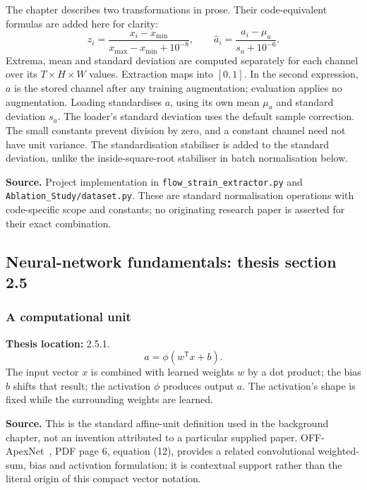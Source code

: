 \documentclass[11pt,a4paper]{article}
\numberwithin{equation}{section}
\begin{document}
\label{fg:input-normalisation}
The chapter describes two transformations in prose. Their code-equivalent
formulas are added here for clarity:
\begin{equation}
    z_i=\frac{x_i-x_{\min}}{x_{\max}-x_{\min}+10^{-8}},
    \qquad
    \widehat a_i=\frac{a_i-\mu_a}{s_a+10^{-6}}.
    \label{fg:eq:input-normalisation}
\end{equation}
Extrema, mean and standard deviation are computed separately for each channel
over its $T\times H\times W$ values. Extraction maps into $[0,1]$.
In the second expression, $a$ is the stored channel after any training
augmentation; evaluation applies no augmentation. Loading standardises $a$,
using its own mean $\mu_a$ and standard deviation $s_a$. The loader's standard
deviation uses the default sample correction. The small constants prevent
division by zero, and a constant channel need not have unit variance. The
standardisation stabiliser is added to the standard deviation, unlike the
inside-square-root stabiliser in batch normalisation below.

\textbf{Source.} Project implementation in
\texttt{flow\_strain\_extractor.py} and \texttt{Ablation\_Study/dataset.py}.
These are standard normalisation operations with code-specific scope and
constants; no originating research paper is asserted for their exact combination.

\subsection{Neural-network fundamentals: thesis section 2.5}

\subsubsection{A computational unit}
\label{fg:unit}
\textbf{Thesis location:} 2.5.1.
\begin{equation}
    a=\phi(w^{\mathsf T}x+b).
    \label{fg:eq:unit}
\end{equation}
The input vector $x$ is combined with learned weights $w$ by a dot product;
the bias $b$ shifts that result; the activation $\phi$ produces output $a$.
The activation's shape is fixed while the surrounding weights are learned.

\textbf{Source.} This is the standard affine-unit definition used in the
background chapter, not an invention attributed to a particular supplied paper.
OFF-ApexNet~\cite{liong2019a}, PDF page 6, equation (12), provides a related
convolutional weighted-sum, bias and activation formulation; it is contextual
support rather than the literal origin of this compact vector notation.
\end{document}
